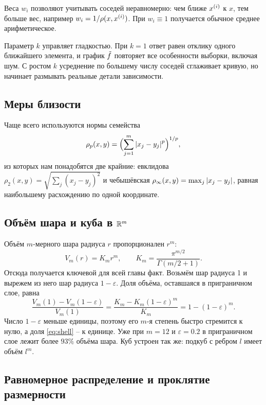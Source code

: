 \documentclass[12pt,a4paper]{article}
\begin{document}
Веса $w_i$ позволяют учитывать соседей неравномерно: чем ближе $x^{(i)}$ к $x$,
тем больше вес, например $w_i = 1/\rho(x, x^{(i)})$. При $w_i \equiv 1$
получается обычное среднее арифметическое.

Параметр $k$ управляет гладкостью. При $k = 1$ ответ равен отклику одного
ближайшего элемента, и график $\tilde{f}$ повторяет все особенности выборки, включая
шум. С ростом $k$ усреднение по большему числу соседей сглаживает кривую, но
начинает размывать реальные детали зависимости.

\subsection{Меры близости}

Чаще всего используются нормы семейства
\[
  \rho_p(x,y) = \Bigl(\sum_{j=1}^{m}\left\lvert x_j - y_j \right\rvert^p\Bigr)^{1/p},
\]
из которых нам понадобятся две крайние: евклидова
$\rho_2(x,y) = \sqrt{\sum_j (x_j-y_j)^2}$ и чебышёвская
$\rho_\infty(x,y) = \max_j \left\lvert x_j - y_j \right\rvert$, равная наибольшему расхождению по
одной координате.

\subsection{Объём шара и куба в \texorpdfstring{$\mathbb{R}^m$}{R\textasciicircum m}}

Объём $m$-мерного шара радиуса $r$ пропорционален $r^m$:
\begin{equation}\label{eq:ball}
  V_m(r) = K_m r^m, \qquad K_m = \frac{\pi^{m/2}}{\Gamma(m/2 + 1)} .
\end{equation}
Отсюда получается ключевой для всей главы факт. Возьмём шар радиуса 1 и вырежем
из него шар радиуса $1-\varepsilon$. Доля объёма, оставшаяся в приграничном слое,
равна
\begin{equation}\label{eq:shell}
  \frac{V_m(1) - V_m(1-\varepsilon)}{V_m(1)}
  = \frac{K_m - K_m(1-\varepsilon)^m}{K_m}
  = 1 - (1-\varepsilon)^m .
\end{equation}
Число $1-\varepsilon$ меньше единицы, поэтому его $m$-я степень быстро стремится
к нулю, а доля \eqref{eq:shell} -- к единице. Уже при $m = 12$ и
$\varepsilon = 0.2$ в приграничном слое лежит более $93\%$ объёма шара. Куб
устроен так же: подкуб с ребром $l$ имеет объём $l^m$.

\subsection{Равномерное распределение и проклятие размерности}
\end{document}
